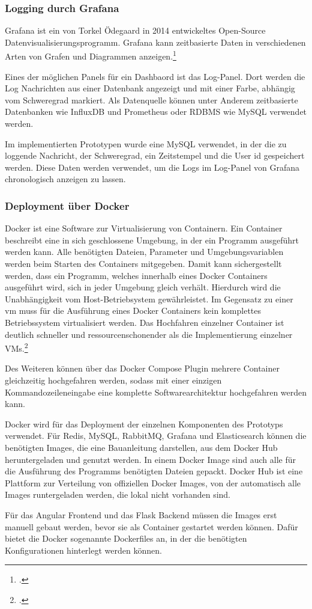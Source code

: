 \subsubsection{Logging durch Grafana}
Grafana ist ein von Torkel Ödegaard in 2014 entwickeltes Open-Source Datenvisualisierungsprogramm. Grafana kann zeitbasierte Daten in verschiedenen Arten von Grafen und Diagrammen anzeigen.\footcite{chakraborty2021grafana}

Eines der möglichen Panels für ein Dashbaord ist das Log-Panel. Dort werden die Log Nachrichten aus einer Datenbank angezeigt und mit einer Farbe, abhängig vom Schweregrad markiert. Als Datenquelle können unter Anderem zeitbasierte Datenbanken wie InfluxDB und Prometheus oder RDBMS wie MySQL verwendet werden.

Im implementierten Prototypen wurde eine MySQL verwendet, in der die zu loggende Nachricht, der Schweregrad, ein Zeitstempel und die User \ac{id} gespeichert werden. Diese Daten werden verwendet, um die Logs im Log-Panel von Grafana chronologisch anzeigen zu lassen.

\subsubsection{Deployment über Docker}
Docker ist eine Software zur Virtualisierung von Containern. Ein Container beschreibt eine in sich geschlossene Umgebung, in der ein Programm ausgeführt werden kann. Alle benötigten Dateien, Parameter und Umgebungsvariablen werden beim Starten des Containers mitgegeben. Damit kann sichergestellt werden, dass ein Programm, welches innerhalb eines Docker Containers ausgeführt wird, sich in jeder Umgebung gleich verhält. Hierdurch wird die Unabhängigkeit vom Host-Betriebsystem gewährleistet. Im Gegensatz zu einer \ac{vm} muss für die Ausführung eines Docker Containers kein komplettes Betriebssystem virtualisiert werden. Das Hochfahren einzelner Container ist deutlich schneller und ressourcenschonender als die Implementierung einzelner VMs.\footcite{anderson2015docker}

Des Weiteren können über das Docker Compose Plugin mehrere Container gleichzeitig hochgefahren werden, sodass mit einer einzigen Kommandozeileneingabe eine komplette Softwarearchitektur hochgefahren werden kann.

Docker wird für das Deployment der einzelnen Komponenten des Prototyps verwendet. Für Redis, MySQL, RabbitMQ, Grafana und Elasticsearch können die benötigten Images, die eine Bauanleitung darstellen, aus dem Docker Hub heruntergeladen und genutzt werden. In einem Docker Image sind auch alle für die Ausführung des Programms benötigten Dateien gepackt. Docker Hub ist eine Plattform zur Verteilung von offiziellen Docker Images, von der automatisch alle Images runtergeladen werden, die lokal nicht vorhanden sind.

Für das Angular Frontend und das Flask Backend müssen die Images erst manuell gebaut werden, bevor sie als Container gestartet werden können. Dafür bietet die Docker sogenannte Dockerfiles an, in der die benötigten Konfigurationen hinterlegt werden können.

